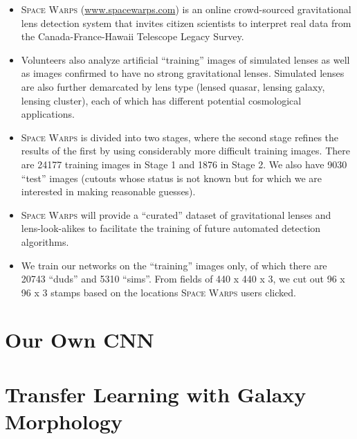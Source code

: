 \documentclass{ucbposter}
\begin{document}
\begin{itemize}
  \item{\textsc{Space Warps} (\url{www.spacewarps.com}) is an online crowd-sourced gravitational
    lens detection system that invites citizen
scientists to interpret real data from the Canada-France-Hawaii Telescope
Legacy Survey.}
\item{Volunteers also analyze artificial ``training'' images of simulated
    lenses as well as images confirmed to have no strong gravitational lenses.
    Simulated lenses are also further demarcated by lens type (lensed quasar,
  lensing galaxy, lensing cluster), each of which has different potential
cosmological applications.}
\item{\textsc{Space Warps} is divided into two stages, where the second stage
    refines the results of the first by using considerably more difficult
  training images. There are 24177 training images in Stage 1 and 1876 in Stage
2. We also have 9030 ``test'' images (cutouts whose status is not known but for
which we are interested in making reasonable guesses).}
\item{\textsc{Space Warps} will provide a ``curated'' dataset of gravitational
  lenses and lens-look-alikes to facilitate the training of future automated detection
algorithms.}
\item{We train our networks on the ``training'' images only, of which there are
  20743 ``duds'' and 5310 ``sims''. From fields of 440 x 440 x 3, we cut
  out 96 x 96 x 3 stamps based on the locations \textsc{Space Warps}
users clicked.}
\end{itemize}


\section{Our Own CNN}


\section{Transfer Learning with Galaxy Morphology}

%

\end{document}
